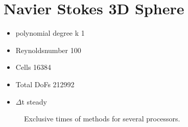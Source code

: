 \documentclass{article}
\begin{document}
\section*{Navier Stokes 3D Sphere}
\begin{itemize}
	\large \item  polynomial degree k 1
	\item Reynoldsnumber 100
	\item Cells 16384
	\item Total DoFs 212992
	\item $\Delta$t steady
\end{itemize}
	\begin{figure}
		\hspace{-2cm}
		\rule{0cm}{1.1cm}
		\caption{Exclusive times of methods for several processors.}
	\end{figure}
\end{document}

